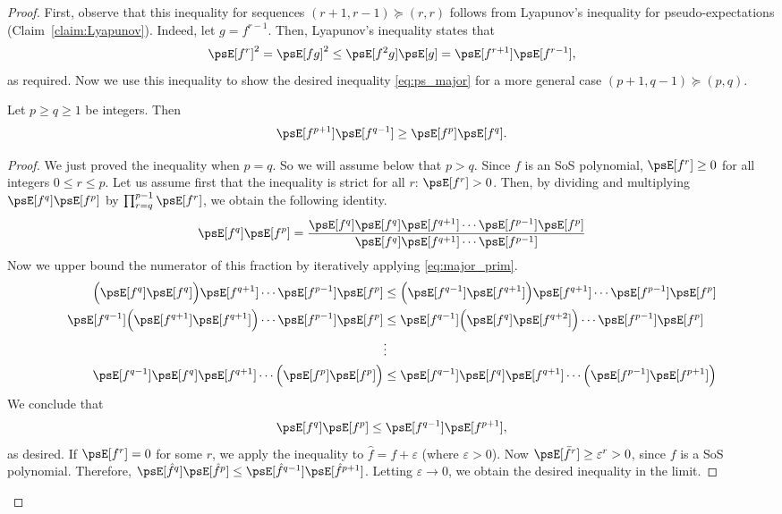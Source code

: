\documentclass[11pt,a4paper]{article}
\begin{document}
\begin{proof}

First, observe that this inequality for sequences $(r+1,r-1)\succeq (r,r)$ follows from Lyapunov's inequality for pseudo-expectations (Claim~\ref{claim:Lyapunov}). Indeed, let $g = f^{r-1}$. Then, Lyapunov's inequality states that 
\begin{equation}
\label{eq:major_prim}
\psE[f^r]^2 = \psE[fg]^2 \leq \psE[f^2g]\psE[g] = \psE[f^{r+1}]\psE[f^{r-1}],
\end{equation}
as required.
Now  we use this inequality to show the desired inequality \eqref{eq:ps_major} for a more general case \((p + 1, q-1) \succeq (p, q)\).
\begin{claim}\label{claim:ps_major_sub}
    Let \(p \geq q \ge 1\) be integers.
    Then
    \[ \psE[f^{p+1}] \psE[f^{q-1}] \ge \psE[f^p] \psE[f^q].\]
\end{claim}
\begin{proof} We just proved the inequality when $p=q$. So we will assume below that $p > q$.  Since $f$ is an SoS polynomial, $\psE[f^r] \geq  0$ for all integers $0\leq r\leq p$.
Let us assume first that the inequality is strict for all $r$: $\psE[f^r] > 0$. Then, by dividing and multiplying $\psE[f^q] \psE[f^p]$ by $\prod_{r=q}^{p-1} \psE[f^r]$, we obtain the following identity.
\[
            \psE[f^q] \psE[f^p] = \frac{\psE[f^q] \psE[f^{q}] \psE[f^{q+1}] \cdots \psE[f^{p-1}] \psE[f^p]}{\psE[f^q] \psE[f^{q+1}] \cdots \psE[f^{p-1}]} 
\]
Now we upper bound the numerator of this fraction by iteratively applying \eqref{eq:major_prim}.
\begin{align*}
\Bigl(\psE[f^q] \psE[f^{q}]\Bigr) \psE[f^{q+1}] \cdots \psE[f^{p-1}] \psE[f^p] &\leq
\Bigl(\psE[f^{q-1}] \psE[f^{q+1}]\Bigr) \psE[f^{q+1}] \cdots \psE[f^{p-1}] \psE[f^p] \\
\psE[f^{q-1}] \Bigl(\psE[f^{q+1}] \psE[f^{q+1}]\Bigr) \cdots \psE[f^{p-1}] \psE[f^p]  &\leq 
\psE[f^{q-1}] \Bigl(\psE[f^{q}] \psE[f^{q+2}]\Bigr) \cdots \psE[f^{p-1}] \psE[f^p] \\
            &\vdots \\
\psE[f^{q-1}] \psE[f^{q}] \psE[f^{q+1}] \cdots \Bigl(\psE[f^{p}] \psE[f^{p}]\Bigr) &\le 
\psE[f^{q-1}] \psE[f^{q}] \psE[f^{q+1}] \cdots \Bigl(\psE[f^{p-1}] \psE[f^{p+1}]\Bigr)
\end{align*}
We conclude that 
$$\psE[f^q] \psE[f^p]  \leq \psE[f^{q-1}] \psE[f^{p+1}],$$
as desired.
If $\psE[f^r] = 0$ for some $r$, we apply the inequality to $\hat f = f + \varepsilon$ (where $\varepsilon > 0$). Now $\psE[{\bar f}^r] \geq \varepsilon^r > 0$, since $f$ is a SoS polynomial. Therefore,
$\psE[\hat{f}^q] \psE[\hat{f}^p]  \leq \psE[\hat{f}^{q-1}] \psE[\hat{f}^{p+1}]$.
Letting $\varepsilon \to 0$, we obtain the desired inequality in the limit.
\end{proof}



\end{proof}
\end{document}

